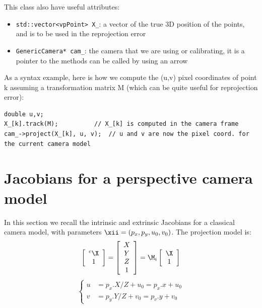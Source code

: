 \documentclass{ecnreport}
\begin{document}
This class also have useful attributes:
\begin{itemize}
 \item \texttt{std::vector<vpPoint> X\_}: a vector of the true 3D position of the points, and is to be used in the reprojection error
 \item \texttt{GenericCamera* cam\_}: the camera that we are using or calibrating, it is a pointer to the methods can be called by using an arrow
\end{itemize}
As a syntax example, here is how we compute the (u,v) pixel coordinates of point k assuming a transformation matrix M (which can be quite useful for reprojection error):
 \begin{center}\cppstyle
\begin{lstlisting}
double u,v;
X_[k].track(M);		     // X_[k] is computed in the camera frame
cam_->project(X_[k], u, v);  // u and v are now the pixel coord. for the current camera model
\end{lstlisting}
\end{center}


\section{Jacobians for a perspective camera model}
\label{sec:jacpersp}

In this section we recall the intrinsic and extrinsic Jacobians for a classical camera model, with parameters $\xii = (p_x, p_y, u_0, v_0)$.
The projection model is:
\begin{equation}
 \left[\begin{array}{c}{}^c\X\\1\end{array}\right]=   \left[\begin{array}{c}X\\Y\\Z\\1\end{array}\right] =\M_i\left[\begin{array}{c}\X\\1\end{array}\right]
\end{equation}
\begin{equation}
 \left\{\begin{array}{ll}
  u &= p_x.X/Z + u_0  = p_x.x + u_0\\
  v &= p_y.Y/Z + v_0 = p_v.y + v_0
 \end{array}\right.
\end{equation}
\end{document}

